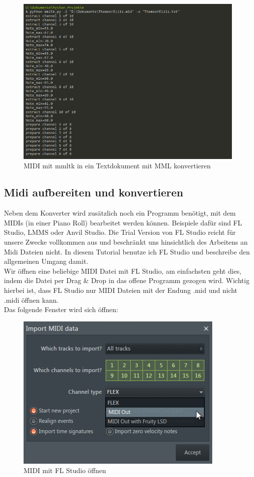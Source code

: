\begin{figure}[htbp] \centering
	\includegraphics[width=.95\linewidth]{images/mmltk.png}
	\caption{MIDI mit mmltk in ein Textdokument mit MML konvertieren}
	\label{mmltk}
\end{figure}

\subsection{Midi aufbereiten und konvertieren}

Neben dem Konverter wird zusätzlich noch ein Programm benötigt, mit dem MIDIs (in einer Piano Roll) bearbeitet werden können. Beispiele dafür sind FL Studio, LMMS oder Anvil Studio. Die Trial Version von FL Studio reicht für unsere Zwecke vollkommen aus und beschränkt uns hinsichtlich des Arbeitens an Midi Dateien nicht. In diesem Tutorial benutze ich FL Studio und beschreibe den allgemeinen Umgang damit. \\
Wir öffnen eine beliebige MIDI Datei mit FL Studio, am einfachsten geht dies, indem die Datei per Drag \& Drop in das offene Programm gezogen wird. Wichtig hierbei ist, dass FL Studio nur MIDI Dateien mit der Endung .mid und nicht .midi öffnen kann. \\
Das folgende Fenster wird sich öffnen: 

\begin{figure}[htbp] \centering
	\includegraphics[width=.45\linewidth]{images/ImportMidi.png}
	\caption{MIDI mit FL Studio öffnen}
	\label{ImportMidi}
\end{figure}

